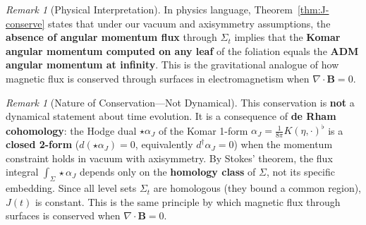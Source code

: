 \documentclass[12pt]{article}
\theoremstyle{plain}
\theoremstyle{definition}
\theoremstyle{remark}
\newtheorem{remark}[theorem]{Remark}
\begin{document}
\begin{remark}[Physical Interpretation]\label{rem:J-conserve-physics}
In physics language, Theorem~\ref{thm:J-conserve} states that under our vacuum and axisymmetry assumptions, the \textbf{absence of angular momentum flux} through $\Sigma_t$ implies that the \textbf{Komar angular momentum computed on any leaf} of the foliation equals the \textbf{ADM angular momentum at infinity}. This is the gravitational analogue of how magnetic flux is conserved through surfaces in electromagnetism when $\nabla \cdot \mathbf{B} = 0$.
\end{remark}

\begin{remark}[Nature of Conservation---Not Dynamical]
This conservation is \textbf{not} a dynamical statement about time evolution. It is a consequence of \textbf{de Rham cohomology}: the Hodge dual $\star\alpha_J$ of the Komar 1-form $\alpha_J = \frac{1}{8\pi}K(\eta,\cdot)^\flat$ is a \textbf{closed 2-form} ($d(\star\alpha_J) = 0$, equivalently $d^\dagger\alpha_J = 0$) when the momentum constraint holds in vacuum with axisymmetry. By Stokes' theorem, the flux integral $\int_{\Sigma} \star\alpha_J$ depends only on the \textbf{homology class} of $\Sigma$, not its specific embedding. Since all level sets $\Sigma_t$ are homologous (they bound a common region), $J(t)$ is constant. This is the same principle by which magnetic flux through surfaces is conserved when $\nabla \cdot \mathbf{B} = 0$.
\end{remark}
\end{document}
